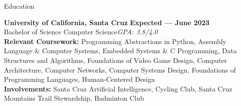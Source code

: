 \documentclass{resume}
\begin{document}
\begin{rSection}{\large Education}

{\bf University of California, Santa Cruz} \hfill {\bf{Expected --- June 2023}}
\\ Bachelor of Science Computer Science\hfill {\emph{GPA: 3.8/4.0}} 
  \\ \textbf{Relevant Coursework:} Programming Abstractions in Python, Assembly Language \& Computer Systems, Embedded Systems \& C Programming, Data Structures and Algorithms, Foundations of Video Game Design, Computer Architecture, Computer Networks, Computer Systems Design, Foundations of Programming Languages, Human-Centered Design
\\ \textbf{Involvements:}  Santa Cruz Artificial Intelligence, Cycling Club, Santa Cruz Mountains Trail Stewardship, Badminton Club

\end{rSection}
\end{document}
